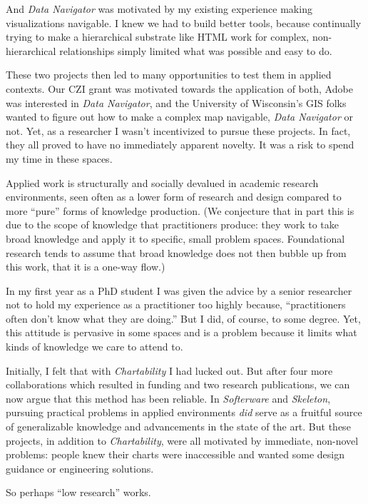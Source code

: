 \documentclass[12pt]{cmuthesis}
\begin{document}
And \textit{Data Navigator} was motivated by my existing experience making visualizations navigable. I knew we had to build better tools, because continually trying to make a hierarchical substrate like HTML work for complex, non-hierarchical relationships simply limited what was possible and easy to do.

These two projects then led to many opportunities to test them in applied contexts. Our CZI grant was motivated towards the application of both, Adobe was interested in \textit{Data Navigator}, and the University of Wisconsin's GIS folks wanted to figure out how to make a complex map navigable, \textit{Data Navigator} or not. Yet, as a researcher I wasn't incentivized to pursue these projects. In fact, they all proved to have no immediately apparent novelty. It was a risk to spend my time in these spaces.

Applied work is structurally and socially devalued in academic research environments, seen often as a lower form of research and design compared to more ``pure'' forms of knowledge production. (We conjecture that in part this is due to the scope of knowledge that practitioners produce: they work to take broad knowledge and apply it to specific, small problem spaces. Foundational research tends to assume that broad knowledge does not then bubble up from this work, that it is a one-way flow.)

In my first year as a PhD student I was given the advice by a senior researcher not to hold my experience as a practitioner too highly because, ``practitioners often don't know what they are doing.'' But I did, of course, to some degree. Yet, this attitude is pervasive in some spaces and is a problem because it limits what kinds of knowledge we care to attend to.

Initially, I felt that with \textit{Chartability} I had lucked out. But after four more collaborations which resulted in funding and two research publications, we can now argue that this method has been reliable. In \textit{Softerware} and \textit{Skeleton}, pursuing practical problems in applied environments \textit{did} serve as a fruitful source of generalizable knowledge and advancements in the state of the art. But these projects, in addition to \textit{Chartability}, were all motivated by immediate, non-novel problems: people knew their charts were inaccessible and wanted some design guidance or engineering solutions.

So perhaps ``low research'' works.
\end{document}
